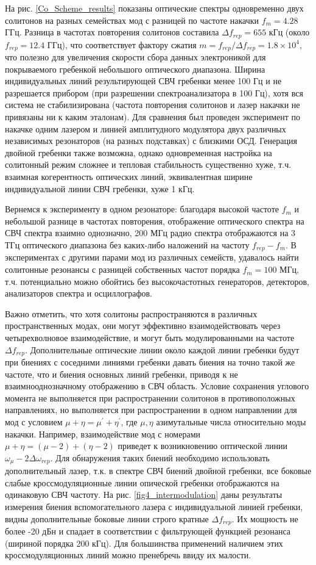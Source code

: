 На рис. \ref{Co_Scheme_results} показаны оптические спектры одновременно двух солитонов на разных семействах мод с разницей по частоте накачки $f_m=4.28$ ГГц. Разница в частотах повторения солитонов составила $\Delta f_{rep}=655$ кГц (около $f_{rep}=12.4$ ГГц), что соответствует фактору сжатия \cite{Coddington2016} $m=f_{rep}/\Delta f_{rep}=1.8\times10^4$, что полезно для увеличения скорости сбора данных электроникой для покрываемого гребенкой небольшого оптического диапазона. Ширина индивидуальных линий результирующей СВЧ гребенки менее 100 Гц и не разрешается прибором (при разрешении спектроанализатора в 100 Гц), хотя вся система не стабилизирована (частота повторения солитонов и лазер накачки не привязаны ни к каким эталонам). Для сравнения был проведен эксперимент по накачке одним лазером и линией амплитудного модулятора двух различных независимых резонаторов (на разных подставках) с близкими ОСД. Генерация двойной гребенки также возможна, однако одновременная настройка на солитонный режим сложнее и тепловая стабильность существенно хуже, т.ч. взаимная когерентность оптических линий, эквивалентная ширине индивидуальной линии СВЧ гребенки, хуже 1 кГц. 

Вернемся к эксперименту в одном резонаторе: благодаря высокой частоте $f_m$ и небольшой разнице в частотах повторения, отображение оптического спектра на СВЧ спектра взаимно однозначно, 200 МГц радио спектра отображаются на 3 ТГц оптического диапазона без каких-либо наложений на частоту $f_{rep}-f_m$. В экспериментах с другими парами мод из различных семейств, удавалось найти солитонные резонансы с разницей собственных частот порядка $f_m=100$ МГц, т.ч. потенциально можно обойтись без высокочастотных генераторов, детекторов, анализаторов спектра и осциллографов.

Важно отметить, что хотя солитоны распространяются в различных пространственных модах, они могут эффективно взаимодействовать через четырехволновое взаимодействие, и могут быть модулированными на частоте $\Delta f_{rep}$. Дополнительные оптические линии около каждой линии гребенки будут при биениях с соседними линиями гребенки давать биения на точно такой же частоте, что и биения основных линий гребенки, приводя к не взаимнооднозначному отображению в СВЧ область. Условие сохранения углового момента не выполняется при распространении солитонов в противоположных направлениях, но выполняется при распространении в одном направлении для мод с условием $\mu+\eta=\mu^\prime+\eta^\prime$, где $\mu,\eta$ азимутальные числа относительно моды накачки. Например, взаимодействие мод с номерами $\mu+\eta=(\mu-2)+(\eta-2)$ приведет к возникновению оптической линии $\omega_{\mu}-2\Delta\omega_{rep}$. Для обнаружения таких биений необходимо использовать дополнительный лазер, т.к. в спектре СВЧ биений двойной гребенки, все боковые слабые кроссмодуляционные линии опической гребенки отображаются на одинаковую СВЧ частоту. На рис. \ref{fig4_intermodulation} даны результаты измерения биения вспомогательного лазера с индивидуальной линией гребенки, видны дополнительные боковые линии строго кратные $\Delta f_{rep}$. Их мощность не более -20 дБн и спадает в соответствии с фильтрующей функцией резонанса (шириной порядка 200 кГц). Для большинства применений наличием этих кроссмодуляционных линий можно пренебречь ввиду их малости.

